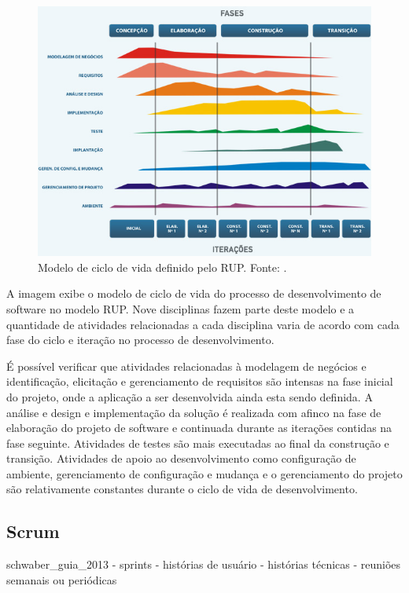 \begin{figure}[htb]
\centering
\includegraphics[scale=0.5]{figuras/ciclo_rup.jpg}
\caption{Modelo de ciclo de vida definido pelo RUP. Fonte: \cite{henrique_rup_2015}.}
\label{ciclo_rup}
\end{figure}

A imagem exibe o modelo de ciclo de vida do processo de desenvolvimento de software no modelo RUP. Nove disciplinas fazem parte deste modelo e a quantidade de atividades relacionadas a cada disciplina varia de acordo com cada fase do ciclo e iteração no processo de desenvolvimento.

É possível verificar que atividades relacionadas à modelagem de negócios e identificação, elicitação e gerenciamento de requisitos são intensas na fase inicial do projeto, onde a aplicação a ser desenvolvida ainda esta sendo definida. A análise e design e implementação da solução é realizada com afinco na fase de elaboração do projeto de software e continuada durante  as iterações contidas na fase seguinte. Atividades de testes são mais executadas ao final da construção e transição. Atividades de apoio ao desenvolvimento como configuração de ambiente, gerenciamento de configuração e mudança e o gerenciamento do projeto são relativamente constantes durante o ciclo de vida de desenvolvimento.

\subsection{Scrum}
schwaber_guia_2013
- sprints
- histórias de usuário
- histórias técnicas
- reuniões semanais ou periódicas
